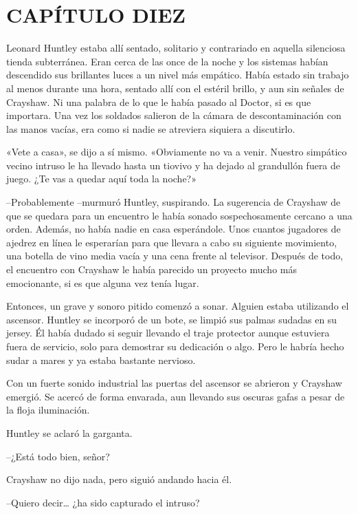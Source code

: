 \chapter*{CAPÍTULO DIEZ}

{Leonard Huntley estaba allí sentado, solitario y contrariado en aquella
 silenciosa tienda subterránea. Eran cerca de las once de la noche y los
 sistemas habían descendido sus brillantes luces a un nivel más empático.
 Había estado sin trabajo al menos durante una hora, sentado allí con el
 estéril brillo, y aun sin señales de Crayshaw. Ni una palabra de lo que
 le había pasado al Doctor, si es que importara. Una vez los soldados
 salieron de la cámara de descontaminación con las manos vacías, era como
si nadie se atreviera siquiera a discutirlo.}

{«Vete a casa», se dijo a sí mismo. «Obviamente no va a venir. Nuestro
 simpático vecino intruso le ha llevado hasta un tiovivo y ha dejado al
grandullón fuera de juego. ¿Te vas a quedar aquí toda la noche?»}

{--Probablemente --murmuró Huntley, suspirando. La sugerencia de
 Crayshaw de que se quedara para un encuentro le había sonado
 sospechosamente cercano a una orden. Además, no había nadie en casa
 esperándole. Unos cuantos jugadores de ajedrez en línea le esperarían
 para que llevara a cabo su siguiente movimiento, una botella de vino
 media vacía y una cena frente al televisor. Después de todo, el
 encuentro con Crayshaw le había parecido un proyecto mucho más
emocionante, si es que alguna vez tenía lugar.}

{Entonces, un grave y sonoro pitido comenzó a sonar. Alguien estaba
 utilizando el ascensor. Huntley se incorporó de un bote, se limpió sus
 palmas sudadas en su jersey. Él había dudado si seguir llevando el traje
 protector aunque estuviera fuera de servicio, solo para demostrar su
 dedicación o algo. Pero le habría hecho sudar a mares y ya estaba
bastante nervioso.}

{Con un fuerte sonido industrial las puertas del ascensor se abrieron y
 Crayshaw emergió. Se acercó de forma envarada, aun llevando sus oscuras
gafas a pesar de la floja iluminación.}

{Huntley se aclaró la garganta.}

{--¿Está todo bien, señor?}

{Crayshaw no dijo nada, pero siguió andando hacia él.}

{--Quiero decir\ldots{} ¿ha sido capturado el intruso?}

